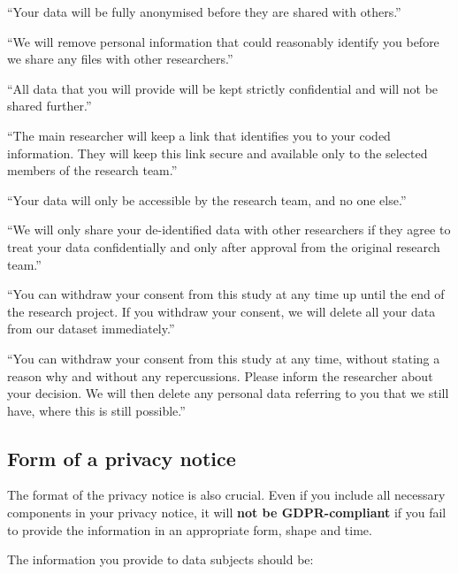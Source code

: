 \documentclass[
]{book}
\begin{document}
``Your data will be fully anonymised before they are shared with others.''

``We will remove personal information that could reasonably identify you before we share any files with other researchers.''

``All data that you will provide will be kept strictly confidential and will not be shared further.''

``The main researcher will keep a link that identifies you to your coded information. They will keep this link secure and available only to the selected members of the research team.''

``Your data will only be accessible by the research team, and no one else.''

``We will only share your de-identified data with other researchers if they agree to treat your data confidentially and only after approval from the original research team.''

``You can withdraw your consent from this study at any time up until the end of the research project. If you withdraw your consent, we will delete all your data from our dataset immediately.''

``You can withdraw your consent from this study at any time, without stating a reason why and without any repercussions. Please inform the researcher about your decision. We will then delete any personal data referring to you that we still have, where this is still possible.''

\hypertarget{form-of-a-privacy-notice}{%
\subsection{Form of a privacy notice}\label{form-of-a-privacy-notice}}

The format of the privacy notice is also crucial. Even if you include all
necessary components in your privacy notice, it will \textbf{not be GDPR-compliant}
if you fail to provide the information in an appropriate form, shape and time.

The information you provide to data subjects should be:
\end{document}
